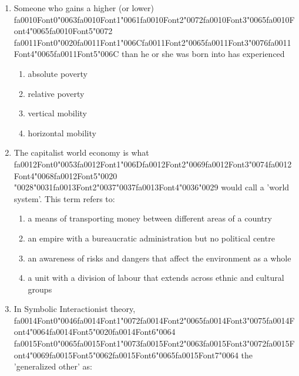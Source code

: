 \documentclass[12pt]{article}
\begin{document}
\begin{enumerate}[label=\arabic*.]
\begin{enumerate}[label=(\alph*)]
    \item children watch violent or sexually explicit films and then copy the behaviour
    \item audiences challenge the ethnic stereotypes represented by the media
    \item elitists express concern with the Americanization of culture
\end{enumerate}
\item Someone who gains a higher (or lower) {\csname fa0010Font0\endcsname\char"0063}{\csname fa0010Font1\endcsname\char"0061}{\csname fa0010Font2\endcsname\char"0072}{\csname fa0010Font3\endcsname\char"0065}{\csname fa0010Font4\endcsname\char"0065}{\csname fa0010Font5\endcsname\char"0072} {\csname fa0011Font0\endcsname\char"0020}{\csname fa0011Font1\endcsname\char"006C}{\csname fa0011Font2\endcsname\char"0065}{\csname fa0011Font3\endcsname\char"0076}{\csname fa0011Font4\endcsname\char"0065}{\csname fa0011Font5\endcsname\char"006C} than he or she was born into has experienced
\begin{enumerate}[label=(\alph*)]
    \item absolute poverty
    \item relative poverty
    \item vertical mobility
    \item horizontal mobility
\end{enumerate}
\item The capitalist world economy is what {\csname fa0012Font0\endcsname\char"0053}{\csname fa0012Font1\endcsname\char"006D}{\csname fa0012Font2\endcsname\char"0069}{\csname fa0012Font3\endcsname\char"0074}{\csname fa0012Font4\endcsname\char"0068}{\csname fa0012Font5\endcsname\char"0020} {\char"0028}{\char"0031}{\csname fa0013Font2\endcsname\char"0037}{\char"0037}{\csname fa0013Font4\endcsname\char"0036}{\char"0029} would call a 'world system'. This term refers to:
\begin{enumerate}[label=(\alph*)]
    \item a means of transporting money between different areas of a country
    \item an empire with a bureaucratic administration but no political centre
    \item an awareness of risks and dangers that affect the environment as a whole
    \item a unit with a division of labour that extends across ethnic and cultural groups
\end{enumerate}
\item In Symbolic Interactionist theory, {\csname fa0014Font0\endcsname\char"0046}{\csname fa0014Font1\endcsname\char"0072}{\csname fa0014Font2\endcsname\char"0065}{\csname fa0014Font3\endcsname\char"0075}{\csname fa0014Font4\endcsname\char"0064}{\csname fa0014Font5\endcsname\char"0020}{\csname fa0014Font6\endcsname\char"0064} {\csname fa0015Font0\endcsname\char"0065}{\csname fa0015Font1\endcsname\char"0073}{\csname fa0015Font2\endcsname\char"0063}{\csname fa0015Font3\endcsname\char"0072}{\csname fa0015Font4\endcsname\char"0069}{\csname fa0015Font5\endcsname\char"0062}{\csname fa0015Font6\endcsname\char"0065}{\csname fa0015Font7\endcsname\char"0064} the 'generalized other' as:

\end{enumerate}
\end{document}
